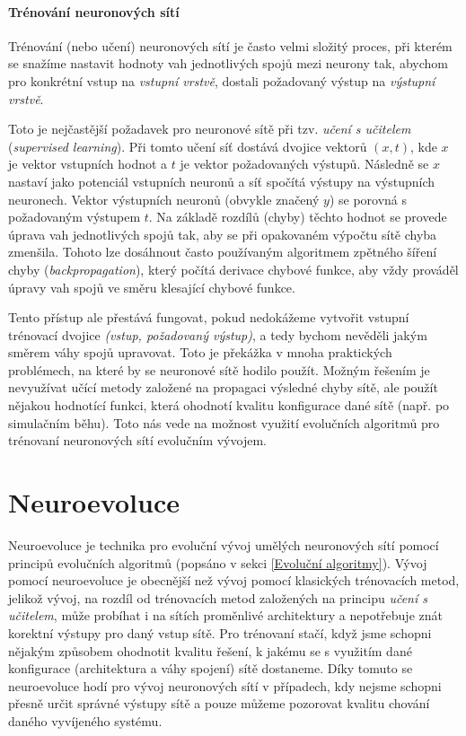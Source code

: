 \paragraph{Trénování neuronových sítí}
Trénování (nebo učení) neuronových sítí je často velmi složitý proces, při
kterém se snažíme nastavit hodnoty vah jednotlivých spojů mezi neurony tak,
abychom pro konkrétní vstup na \emph{vstupní vrstvě}, dostali požadovaný výstup
na \emph{výstupní vrstvě}. 

Toto je nejčastější požadavek pro neuronové sítě při tzv. \emph{učení s
učitelem} (\emph{supervised learning}). Při tomto učení síť dostává dvojice
vektorů $(x, t)$, kde $x$ je vektor vstupních hodnot a $t$ je vektor
požadovaných výstupů. Následně se $x$ nastaví jako potenciál vstupních neuronů
a síť spočítá výstupy na výstupních neuronech. Vektor výstupních neuronů
(obvykle značený $y$) se porovná s požadovaným výstupem $t$. Na základě rozdílů
(chyby) těchto hodnot se provede úprava vah jednotlivých spojů tak, aby se při
opakovaném výpočtu sítě chyba zmenšila. Tohoto lze dosáhnout často používaným
algoritmem zpětného šíření chyby (\emph{backpropagation}), který počítá
derivace chybové funkce, aby vždy prováděl úpravy vah spojů ve směru klesající
chybové funkce.

Tento přístup ale přestává fungovat, pokud nedokážeme vytvořit vstupní
trénovací dvojice \emph{(vstup, požadovaný výstup)}, a tedy bychom nevěděli jakým
směrem váhy spojů upravovat. Toto je překážka v mnoha praktických problémech,
na které by se neuronové sítě hodilo použít. Možným řešením je nevyužívat učící
metody založené na propagaci výsledné chyby sítě, ale použít nějakou hodnotící
funkci, která ohodnotí kvalitu konfigurace dané sítě (např. po simulačním
běhu). Toto nás vede na možnost využití evolučních algoritmů pro trénovaní
neuronových sítí evolučním vývojem.

\section{Neuroevoluce} \label{NN - evolve}
Neuroevoluce \citet{Lehman:2013} je technika pro evoluční vývoj umělých
neuronových sítí pomocí principů evolučních algoritmů (popsáno v sekci
\ref{Evoluční algoritmy}). Vývoj pomocí neuroevoluce je obecnější než vývoj
pomocí klasických trénovacích metod, jelikož vývoj, na rozdíl od trénovacích
metod založených na principu \emph{učení s učitelem}, může probíhat i na sítích
proměnlivé architektury a nepotřebuje znát korektní výstupy pro daný vstup
sítě. Pro trénovaní stačí, když jsme schopni nějakým způsobem ohodnotit kvalitu
řešení, k jakému se s využitím dané konfigurace (architektura a váhy spojení)
sítě dostaneme. Díky tomuto se neuroevoluce hodí pro vývoj neuronových sítí v
případech, kdy nejsme schopni přesně určit správné výstupy sítě a pouze můžeme
pozorovat kvalitu chování daného vyvíjeného systému.

